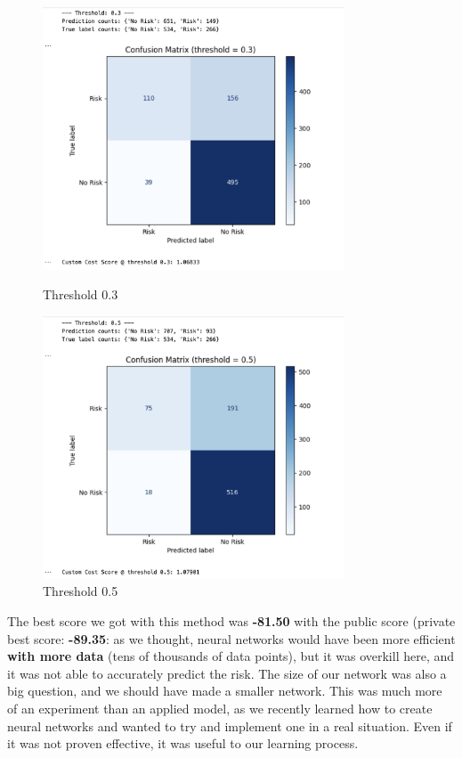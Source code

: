 \documentclass[12pt]{report}
\begin{document}
\begin{figure}[htbp]
    \centering
    \begin{minipage}[t]{0.45\textwidth}
        \centering
        \includegraphics[width=0.8\textwidth]{threshold_03.png}
        \caption{Threshold 0.3}
        \label{fig:threshold_03}
    \end{minipage}
    \hfill
    \begin{minipage}[t]{0.45\textwidth}
        \centering
        \includegraphics[width=0.8\textwidth]{threshold_05.png}
        \caption{Threshold 0.5}
        \label{fig:threshold_05}
    \end{minipage}
\end{figure}

The best score we got with this method was \textbf{-81.50} with the public score (private best score: \textbf{-89.35}: as we thought, neural networks would have been more efficient \textbf{with more data} (tens of thousands of data points), but it was overkill here, and it was not able to accurately predict the risk. The size of our network was also a big question, and we should have made a smaller network. 
This was much more of an experiment than an applied model, as we recently learned how to create neural networks and wanted to try and implement one in a real situation. Even if it was not proven effective, it was useful to our learning process.
\end{document}
